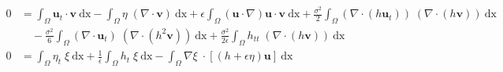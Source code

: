 \documentclass[11pt,a4paper]{article}
\begin{document}
		\begin{equation}
			\begin{split}
				0 &= \int_{\Omega} \! \mathbf{u}_t \cdot \mathbf{v} \: \mathrm{dx} - \int_{\Omega} \! \eta \; (\nabla \cdot \mathbf{v}) \: \mathrm{dx} + \epsilon \! \int_{\Omega} \! (\mathbf{u} \cdot \nabla ) \mathbf{u} \cdot \mathbf{v} \: \mathrm{dx} + \frac{\sigma^2}{2} \! \int_{\Omega} \!  (\nabla \cdot (h 
\mathbf{u}_t)) \; (\nabla \cdot (h \mathbf{v}) )\: \mathrm{dx} \\ 
				&\quad - \frac{\sigma^2}{6} \! \int_{\Omega} \! (\nabla \cdot \mathbf{u}_t) \; (\nabla  \cdot (h^2  \mathbf{v})) \: \mathrm{dx} + \frac{\sigma^2}{2 \epsilon} \! \int_{\Omega} \!  h_{tt}  \; (\nabla \cdot( h \mathbf{v})) \: \mathrm{dx}\\
				0 &= \int_{\Omega}\! \eta_t \; \xi \: \mathrm{dx} +\frac{1}{\epsilon}\int_{\Omega}\! h_t \; \xi \: \mathrm{dx} -\int_{\Omega}\! \nabla \xi \; \cdot [(h+\epsilon\eta) \mathbf{u}]  \: \mathrm{dx}
			\end{split}
		\end{equation}
		
		\pagebreak
		
\end{document}
